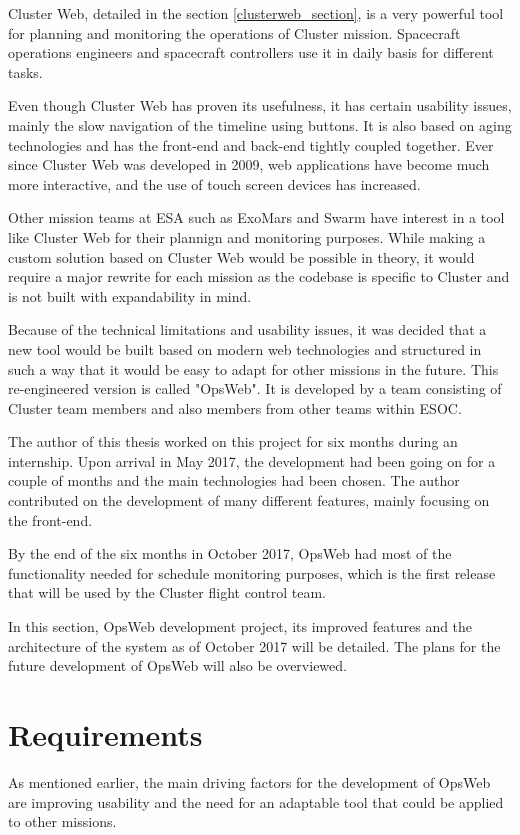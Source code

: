 Cluster Web, detailed in the section \ref{clusterweb_section}, is a very powerful tool for planning and monitoring the operations of Cluster mission. Spacecraft operations engineers and spacecraft controllers use it in daily basis for different tasks.

Even though Cluster Web has proven its usefulness, it has certain usability issues, mainly the slow navigation of the timeline using buttons. It is also based on aging technologies and has the front-end and back-end tightly coupled together. Ever since Cluster Web was developed in 2009, web applications have become much more interactive, and the use of touch screen devices has increased.

Other mission teams at ESA such as ExoMars and Swarm have interest in a tool like Cluster Web for their plannign and monitoring purposes. While making a custom solution based on Cluster Web would be possible in theory, it would require a major rewrite for each mission as the codebase is specific to Cluster and is not built with expandability in mind.

Because of the technical limitations and usability issues, it was decided that a new tool would be built based on modern web technologies and structured in such a way that it would be easy to adapt for other missions in the future. This re-engineered version is called "OpsWeb". It is developed by a team consisting of Cluster team members and also members from other teams within ESOC.

The author of this thesis worked on this project for six months during an internship. Upon arrival in May 2017, the development had been going on for a couple of months and the main technologies had been chosen. The author contributed on the development of many different features, mainly focusing on the front-end. 

By the end of the six months in October 2017, OpsWeb had most of the functionality needed for schedule monitoring purposes, which is the first release that will be used by the Cluster flight control team.

In this section, OpsWeb development project, its improved features and the architecture of the system as of October 2017 will be detailed. The plans for the future development of OpsWeb will also be overviewed.

\section{Requirements}
As mentioned earlier, the main driving factors for the development of OpsWeb are improving usability and the need for an adaptable tool that could be applied to other missions.
